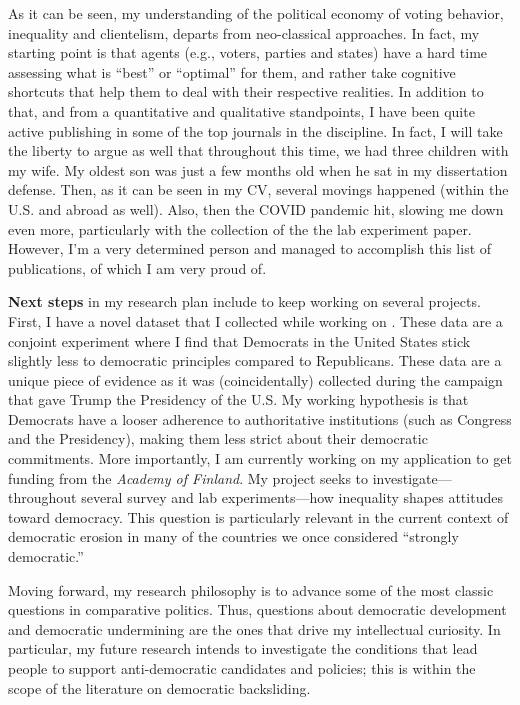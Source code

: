 \documentclass[10pt,stdletter,dateno,sigleft]{newlfm} %
\begin{document}
\begin{newlfm}
As it can be seen, my understanding of the political economy of voting behavior, inequality and clientelism, departs from neo-classical approaches. In fact, my starting point is that agents (e.g., voters, parties and states) have a hard time assessing what is ``best'' or ``optimal'' for them, and rather take cognitive shortcuts that help them to deal with their respective realities. In addition to that, and from a quantitative and qualitative standpoints, I have been quite active publishing in some of the top journals in the discipline. In fact, I will take the liberty to argue as well that throughout this time, we had three children with my wife. My oldest son was just a few months old when he sat in my dissertation defense. Then, as it can be seen in my CV, several movings happened (within the U.S. and abroad as well). Also, then the COVID pandemic hit, slowing me down even more, particularly with the collection of the the lab experiment paper. However, I'm a very determined person and managed to accomplish this list of publications, of which I am very proud of. 

{\bf Next steps} in my research plan include to keep working on several projects. First, I have a novel dataset that I collected while working on \textcite{Bahamonde2020a}. These data are a conjoint experiment where I find that Democrats in the United States stick slightly less to democratic principles compared to Republicans. These data are a unique piece of evidence as it was (coincidentally) collected during the campaign that gave Trump the Presidency of the U.S. My working hypothesis is that Democrats have a looser adherence to authoritative institutions (such as Congress and the Presidency), making them less strict about their democratic commitments. More importantly, I am currently working on my application to get funding from the \emph{Academy of Finland}. My project seeks to investigate---throughout several survey and lab experiments---how inequality shapes attitudes toward democracy. This question is particularly relevant in the current context of democratic erosion in many of the countries we once considered ``strongly democratic.''

Moving forward, my research philosophy is to advance some of the most classic questions in comparative politics. Thus, questions about democratic development and democratic undermining are the ones that drive my intellectual curiosity. In particular, my future research intends to investigate the conditions that lead people to support anti-democratic candidates and policies; this is within the scope of the literature on democratic backsliding. 


\end{newlfm}
\end{document}
